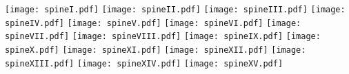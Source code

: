 \documentclass{article}
\begin{document}
\pagestyle{empty}%
\noindent
\texttt{[image: spineI.pdf]}%
\texttt{[image: spineII.pdf]}%
\texttt{[image: spineIII.pdf]}%
\texttt{[image: spineIV.pdf]}%
\texttt{[image: spineV.pdf]}%
\texttt{[image: spineVI.pdf]}%
\texttt{[image: spineVII.pdf]}%
\texttt{[image: spineVIII.pdf]}%
\texttt{[image: spineIX.pdf]}%
\texttt{[image: spineX.pdf]}%
\texttt{[image: spineXI.pdf]}%
\texttt{[image: spineXII.pdf]}%
\texttt{[image: spineXIII.pdf]}%
\texttt{[image: spineXIV.pdf]}%
\texttt{[image: spineXV.pdf]}%
\end{document}
